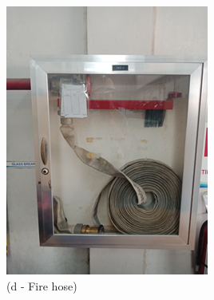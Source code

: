\begin{figure}[!h]
\begin{minipage}[b]{0.22\linewidth}
		\includegraphics[width=\textwidth]{figures/ch04_fig_safety06}
		\caption*{(d - Fire hose)}
	\end{minipage}
	\hspace{0.03cm}
	\begin{minipage}[b]{0.22\linewidth}
		\centering

\end{minipage}
\end{figure}
